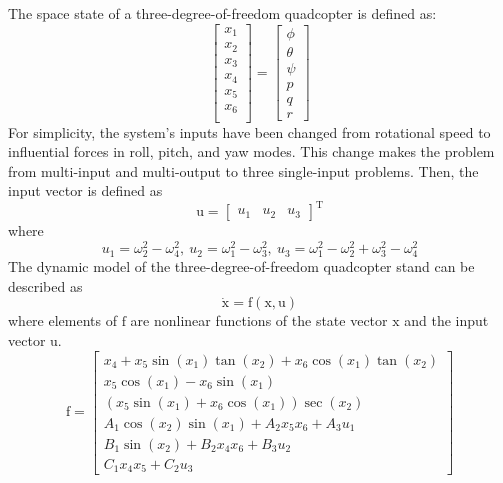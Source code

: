 \documentclass[conference]{IEEEtran}
\begin{document}
The space state of a three-degree-of-freedom quadcopter is defined as:
\begin{equation}
	\begin{bmatrix}
		x_1\\x_2\\x_3\\x_4\\x_5\\x_6\\
	\end{bmatrix} = 
\begin{bmatrix}
	\phi\\ \theta \\ \psi \\ p\\ q\\ r
\end{bmatrix}
\end{equation}
For simplicity, the system's inputs have been changed from rotational speed to influential forces in roll, pitch, and yaw modes. This change makes the problem from multi-input and multi-output to three single-input problems.
Then, the input vector is defined as
\begin{equation}
	\boldsymbol{\mathrm{u}} = \begin{bmatrix}
		u_1&u_2&u_3
	\end{bmatrix}^\mathrm{T}
\end{equation}
where 
\begin{equation}\label{SISO_force}
	u_1 = \omega_2^2 - \omega_4^2, ~
	u_2 = \omega_1^2 - \omega_3^2, ~
	u_3 = \omega_1^2 - \omega_2^2  + \omega_3^2 - \omega_4^2
\end{equation}
The dynamic model of the three-degree-of-freedom quadcopter stand can be described as
\begin{equation}
	\boldsymbol{\dot{\mathrm{x}}} = \boldsymbol{\mathrm{f}}(\boldsymbol{\mathrm{x}}, \boldsymbol{\mathrm{u}})
\end{equation}
where elements of $\boldsymbol{\mathrm{f}}$ are nonlinear functions of the state vector $\boldsymbol{\mathrm{x}}$
and the input vector $\boldsymbol{\mathrm{u}}$.
\begin{equation}
	\boldsymbol{\mathrm{f}} = \begin{bmatrix}
		x_4 + x_5\sin(x_1)\tan(x_2) + x_6\cos(x_1)\tan(x_2)\\
		x_5\cos(x_1)- x_6\sin(x_1)\\
		(x_5\sin(x_1) + x_6\cos(x_1))\sec(x_2)\\
		A_1\cos(x_2)\sin(x_1) + 
		A_2x_5x_6 + A_3u_1
		\\
		B_1\sin(x_2) + 
		B_2x_4x_6 + B_3u_2\\
		C_1x_4x_5 + 
		C_2u_3
	\end{bmatrix}
\end{equation} 
\end{document}
